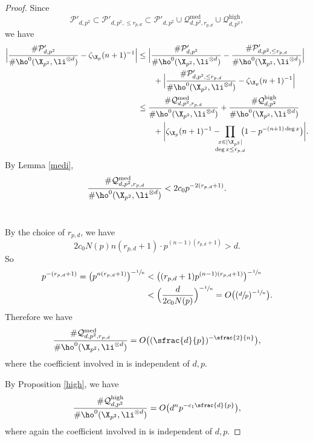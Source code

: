 \begin{proof}
Since
\[
\mathcal{P}'_{d,p^2}\subset \mathcal{P}'_{d,p^2,\leq r_{p,d}}\subset \mathcal{P}'_{d,p^2}\cup \mathcal{Q}^{\mathrm{med}}_{d,p^2,r_{p,d}}\cup \mathcal{Q}^{\mathrm{high}}_{d,p^2},
\]
we have
\begin{align*}
\Bigl| \frac{\#\mathcal{P}'_{d,p^2}}{\#\ho^0(\X_{p^2}, \li^{\otimes d})}-\zeta_{\X_p}(n+1)^{-1} \Bigr|
&\leq \Bigl| \frac{\#\mathcal{P}'_{d,p^2}}{\#\ho^0(\X_{p^2}, \li^{\otimes d})}-\frac{\#\mathcal{P}'_{d,p^2,\leq r_{p,d}}}{\#\ho^0(\X_{p^2}, \li^{\otimes d})} \Bigr|\\
&\hspace*{7mm}+\Bigl| \frac{\#\mathcal{P}'_{d,p^2,\leq r_{p,d}}}{\#\ho^0(\X_{p^2}, \li^{\otimes d})}-\zeta_{\X_p}(n+1)^{-1} \Bigr| \\
&\leq \frac{\#\mathcal{Q}^{\mathrm{med}}_{d,p^2,r_{p,d}}}{\#\ho^0(\X_{p^2}, \li^{\otimes d})} +\frac{\#\mathcal{Q}^{\mathrm{high}}_{d,p^2}}{\#\ho^0(\X_{p^2}, \li^{\otimes d})}\\
&\hspace*{7mm}+ \biggl| \zeta_{\X_p}(n+1)^{-1}-\hspace*{-3mm}\prod_{\substack{x\in |\X_{p^2}|\\ \deg x\leq r_{p,d}}}\hspace*{-2mm} \bigl(1-p^{-(n+1)\deg x} \bigr) \biggr|.
\end{align*}
By Lemma \ref{medi},
\[
\frac{\#\mathcal{Q}^{\mathrm{med}}_{d,p^2,r_{p,d}}}{\#\ho^0(\X_{p^2}, \li^{\otimes d})}<2c_0p^{-2(r_{p,d}+1)}.
\]
$ $

By the choice of $r_{p,d}$, we have
\[
2c_0N(p)n(r_{p,d}+1) \cdot p^{(n-1)(r_{p,d}+1)}>d.
\]
So
\begin{align*}
p^{-(r_{p,d}+1)}=\bigl(p^{n(r_{p,d}+1)} \bigr)^{-\sfrac{1}{n}}
&<\bigl((r_{p,d}+1)p^{(n-1)(r_{p,d}+1)} \bigr)^{-\sfrac{1}{n}}\\
&< \Bigl(\frac{d}{2c_0N(p)}\Bigr)^{-\sfrac{1}{n}}=O\bigl((\sfrac{d}{p})^{-\sfrac{1}{n}} \bigr).
\end{align*}
Therefore we have
\[
\frac{\#\mathcal{Q}^{\mathrm{med}}_{d,p^2,r_{p,d}}}{\#\ho^0(\X_{p^2}, \li^{\otimes d})}=O\bigl((\sfrac{d}{p})^{-\sfrac{2}{n}} \bigr),
\]
where the coefficient involved in is independent of $d,p$.

By Proposition \ref{high}, we have
\[
\frac{\#\mathcal{Q}_{d,p^2}^{\mathrm{high}}}{\#\ho^0(\X_{p^2}, \li^{\otimes d})}=O\bigl(d^{n}p^{-c_1\sfrac{d}{p}} \bigr),
\]
where again the coefficient involved in is independent of $d,p$.


\end{proof}
